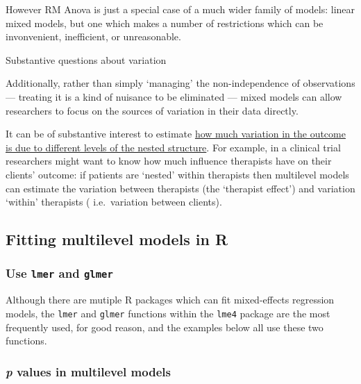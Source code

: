 \documentclass[]{article}
\begin{document}
However RM Anova is just a special case of a much wider family of models: linear
mixed models, but one which makes a number of restrictions which can be
invonvenient, inefficient, or unreasonable.

Substantive questions about variation

Additionally, rather than simply `managing' the non-independence of observations
--- treating it is a kind of nuisance to be eliminated --- mixed models can
allow researchers to focus on the sources of variation in their data directly.

It can be of substantive interest to estimate
\protect\hyperlink{icc-and-vpc}{how much variation in the outcome is due to different levels of the nested structure}.
For example, in a clinical trial researchers might want to know how much
influence therapists have on their clients' outcome: if patients are `nested'
within therapists then multilevel models can estimate the variation between
therapists (the `therapist effect') and variation `within' therapists (
i.e.~variation between clients).

\hypertarget{fitting-models}{%
\subsection*{Fitting multilevel models in R}\label{fitting-models}}

\hypertarget{use-lmer-and-glmer}{%
\subsubsection*{\texorpdfstring{Use \texttt{lmer} and \texttt{glmer}}{Use lmer and glmer}}\label{use-lmer-and-glmer}}

Although there are mutiple R packages which can fit mixed-effects regression
models, the \texttt{lmer} and \texttt{glmer} functions within the \texttt{lme4} package are the most
frequently used, for good reason, and the examples below all use these two
functions.

\hypertarget{p-values-in-multilevel-models}{%
\subsubsection*{\texorpdfstring{\emph{p} values in multilevel models}{p values in multilevel models}}\label{p-values-in-multilevel-models}}
\end{document}
